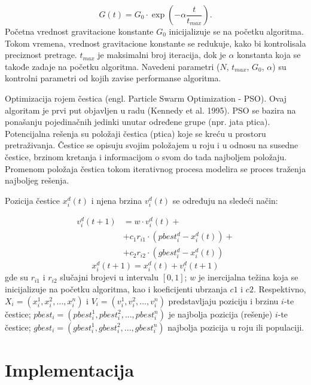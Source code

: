 \begin{equation}
    G(t) = G_0 \cdot \exp \left(- \alpha \frac{t}{t_{max}} \right).
\end{equation}
Početna vrednost gravitacione konstante $G_0$ inicijalizuje se na početku algoritma. Tokom vremena, vrednost gravitacione konstante se redukuje, kako bi kontrolisala preciznost pretrage. $t_{max}$ je maksimalni broj iteracija, dok je $\alpha$ konstanta koja se takođe zadaje na početku algoritma. Navedeni parametri ($N$, $t_{max}$, $G_0$, $\alpha$) su kontrolni parametri od kojih zavise performanse algoritma.

Optimizacija rojem čestica (engl. Particle Swarm Optimization - PSO). Ovaj algoritam je prvi put objavljen u radu (Kennedy et al. 1995). PSO se bazira na ponašanju pojedinačnih jedinki unutar određene grupe (npr. jata ptica). Potencijalna rešenja su položaji čestica (ptica) koje se kreću u prostoru pretraživanja. Čestice se opisuju svojim položajem u roju i u odnosu na susedne čestice, brzinom kretanja i informacijom o svom do tada najboljem položaju. Promenom položaja čestica tokom iterativnog procesa modelira se proces traženja najboljeg rešenja. 

Pozicija čestice $x_i^d(t)$ i njena brzina $v_i^d(t)$ se određuju na sledeći način:

\begin{align}
    v_i^d(t+1) & = w \cdot v_i^d(t) + \nonumber \\
    & + c_1 r_{i1} \cdot (pbest_i^d-x_i^d(t)) + \nonumber \\ 
    & + c_2 r_{i2} \cdot (gbest_i^d-x_i^d(t))
\end{align}
\begin{equation}
    x_i^d(t+1) = x_i^d(t) + v_i^d(t + 1)
\end{equation}
gde su $r_{i1}$ i $r_{i2}$ slučajni brojevi u intervalu $[0,1]$; $w$ je inercijalna težina koja se inicijalizuje na početku algoritma, kao i koeficijenti ubrzanja $c1$ i $c2$. Respektivno, $X_i =(x_i^1, x_i^2, \dots , x_i^n)$ i $V_i =(v_i^1, v_i^2, \dots , v_i^n)$ predstavljaju poziciju i brzinu $i$-te čestice; $pbest_i = (pbest_i^1,pbest_i^2,...,pbest_i^n)$ je najbolja pozicija (rešenje) $i$-te čestice; $gbest_i = (gbest_i^1,gbest_i^2,...,gbest_i^n)$ najbolja pozicija u roju ili populaciji.

\section{Implementacija}

